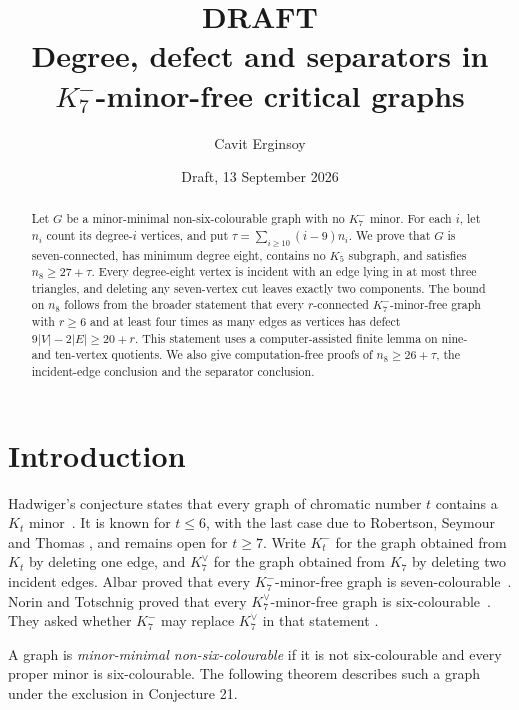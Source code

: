 \documentclass[11pt]{amsart}
\title[DRAFT: Degree, defect and separators]
{\textbf{DRAFT}\\[0.5ex]
Degree, defect and separators in
$K_7^{-}$-minor-free critical graphs}
\author{Cavit Erginsoy}
\date{Draft, 13 September 2026}
\begin{document}
\begin{abstract}
Let $G$ be a minor-minimal non-six-colourable graph with no $K_7^{-}$
minor.  For each $i$, let $n_i$ count its degree-$i$ vertices, and put
$\tau=\sum_{i\geq10}(i-9)n_i$.  We prove that $G$ is seven-connected,
has minimum degree eight, contains no $K_5$ subgraph, and satisfies
$n_8\geq27+\tau$.  Every degree-eight vertex is incident with an edge
lying in at most three triangles, and deleting any seven-vertex cut
leaves exactly two components.  The bound on $n_8$ follows from the broader
statement that every $r$-connected $K_7^{-}$-minor-free graph with $r\geq6$
and at least four times as many edges as vertices has defect
$9|V|-2|E|\geq20+r$.  This statement uses a computer-assisted finite
lemma on nine- and ten-vertex quotients.  We also give computation-free
proofs of $n_8\geq26+\tau$, the incident-edge conclusion and the
separator conclusion.
\end{abstract}

\maketitle
{}

\section{Introduction}

Hadwiger's conjecture states that every graph of chromatic number $t$
contains a $K_t$ minor~\cite{Hadwiger1943}.  It is known for $t\leq6$, with
the last case due to Robertson, Seymour and Thomas
\cite{RobertsonSeymourThomas1993}, and remains open for $t\geq7$.  Write
$K_t^{-}$ for the graph obtained from $K_t$ by deleting one edge, and
$K_7^{\vee}$ for the graph obtained from $K_7$ by deleting two incident
edges.  Albar proved that every $K_7^{-}$-minor-free graph is
seven-colourable~\cite[Theorem~1]{Albar2014}.  Norin and Totschnig proved
that every $K_7^{\vee}$-minor-free graph is
six-colourable~\cite[Theorem~4]{NorinTotschnig2025}.  They asked whether
$K_7^{-}$ may replace $K_7^{\vee}$ in that statement
\cite[Conjecture~21]{NorinTotschnig2025}.

A graph is \emph{minor-minimal non-six-colourable} if it is not
six-colourable and every proper minor is six-colourable.  The following
theorem describes such a graph under the exclusion in Conjecture 21.
\end{document}
